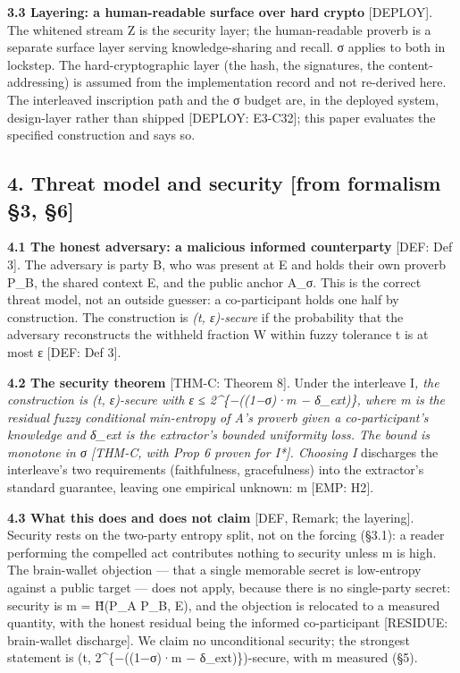 \documentclass[
  11pt,
]{article}
\begin{document}
\textbf{3.3 Layering: a human-readable surface over hard crypto}
{[}DEPLOY{]}. The whitened stream Z is the security layer; the
human-readable proverb is a separate surface layer serving
knowledge-sharing and recall. σ applies to both in lockstep. The
hard-cryptographic layer (the hash, the signatures, the
content-addressing) is assumed from the implementation record and not
re-derived here. The interleaved inscription path and the σ budget are,
in the deployed system, design-layer rather than shipped {[}DEPLOY:
E3-C32{]}; this paper evaluates the specified construction and says so.

\subsection{4. Threat model and security {[}from formalism §3,
§6{]}}\label{threat-model-and-security-from-formalism-3-6}

\textbf{4.1 The honest adversary: a malicious informed counterparty}
{[}DEF: Def 3{]}. The adversary is party B, who was present at E and
holds their own proverb P\_B, the shared context E, and the public
anchor A\_σ. This is the correct threat model, not an outside guesser: a
co-participant holds one half by construction. The construction is
\emph{(t, ε)-secure} if the probability that the adversary reconstructs
the withheld fraction W within fuzzy tolerance t is at most ε {[}DEF:
Def 3{]}.

\textbf{4.2 The security theorem} {[}THM-C: Theorem 8{]}. Under the
interleave I\emph{, the construction is (t, ε)-secure with ε ≤
2\^{}\{−((1−σ)·m − δ\_ext)\}, where m is the residual fuzzy conditional
min-entropy of A's proverb given a co-participant's knowledge and δ\_ext
is the extractor's bounded uniformity loss. The bound is monotone in σ
{[}THM-C, with Prop 6 proven for I*{]}. Choosing I} discharges the
interleave's two requirements (faithfulness, gracefulness) into the
extractor's standard guarantee, leaving one empirical unknown: m {[}EMP:
H2{]}.

\textbf{4.3 What this does and does not claim} {[}DEF, Remark; the
layering{]}. Security rests on the two-party entropy split, not on the
forcing (§3.1): a reader performing the compelled act contributes
nothing to security unless m is high. The brain-wallet objection ---
that a single memorable secret is low-entropy against a public target
--- does not apply, because there is no single-party secret: security is
m = H̃(P\_A \textbar{} P\_B, E), and the objection is relocated to a
measured quantity, with the honest residual being the informed
co-participant {[}RESIDUE: brain-wallet discharge{]}. We claim no
unconditional security; the strongest statement is (t, 2\^{}\{−((1−σ)·m
− δ\_ext)\})-secure, with m measured (§5).
\end{document}
